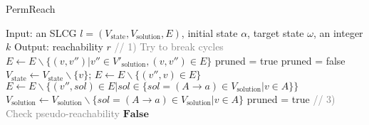 
\begin{algorithm}
  \caption{PermReach}\label{alg:perm}
  \begin{algorithmic}[1]
   \State Input: an SLCG $l=(V_{\mathrm{state}},V_{\mathrm{solution}}, E)$, initial state $\alpha$, target state $\omega$, an integer $k$
\State Output: reachability $r$
\State \textcolor{gray}{// 1) Try to break cycles}%
                \State $E\gets E\backslash \{(v,v'')|v''\in V'_{\mathrm{solution}},(v,v'')\in E\}$
            \EndIf
        \EndFor
    \EndIf
\EndFor %
\State{\textcolor{gray}{// 2) Remove useless nodes/edges}} %
\State pruned = true
    \State pruned = false
            \State $V_{\mathrm{state}} \gets V_{\mathrm{state}}\backslash \{v\}$; $E\gets E\backslash \{ (v'',v)\in E\}$
            \State $E\gets E\backslash \{ (v'',sol)\in E | sol \in \{sol = (A \rightarrow a) \in V_{\mathrm{solution}} | v \in A\}\}$
            \State $V_{\mathrm{solution}} \gets V_{\mathrm{solution}}\backslash \{sol = (A \rightarrow a) \in V_{\mathrm{solution}} | v \in A\}$
            \State pruned = true
        \EndIf
    \EndFor %
\EndWhile
\State \textcolor{gray}{// 3) Check pseudo-reachability} %
    \State \Return $\mathbf{False}$
\EndIf %

  \end{algorithmic}
\end{algorithm}

